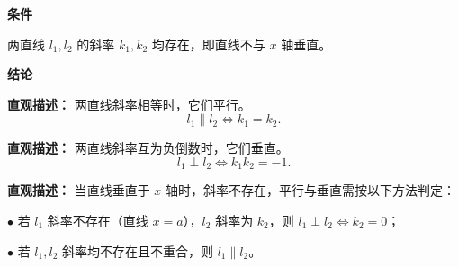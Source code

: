 \begin{statementbox}

	\textbf{\textcolor{CStatement}{条件}}
	\begin{description}[style=nextline, leftmargin=2.8em, labelsep=0.5em, itemsep=0.35em]
		\item[\textbf{\textcolor{CStatement}{条件 1（斜率存在前提）：}}] 两直线 $l_1,l_2$ 的斜率 $k_1,k_2$ 均存在，即直线不与 $x$ 轴垂直。
	\end{description}

	\textbf{\textcolor{CStatement}{结论}}
	\begin{description}[style=nextline, leftmargin=2.8em, labelsep=0.5em, itemsep=0.45em]
		\item[\textbf{\textcolor{CStatement}{结论一（平行判定）：}}]
			\textbf{\textcolor{CStatement}{直观描述：}}
			两直线斜率相等时，它们平行。
			\[
				l_1 \parallel l_2 \Longleftrightarrow k_1 = k_2.
			\]

		\item[\textbf{\textcolor{CStatement}{结论二（垂直判定）：}}]
			\textbf{\textcolor{CStatement}{直观描述：}}
			两直线斜率互为负倒数时，它们垂直。
			\[
				l_1 \perp l_2 \Longleftrightarrow k_1 k_2 = -1.
			\]

		\item[\textbf{\textcolor{CStatement}{推广结论（斜率不存在情形）：}}]
			\textbf{\textcolor{CStatement}{直观描述：}}
			当直线垂直于 $x$ 轴时，斜率不存在，平行与垂直需按以下方法判定：
			\par
			$\bullet$ 若 $l_1$ 斜率不存在（直线 $x=a$），$l_2$ 斜率为 $k_2$，则 $l_1 \perp l_2 \Longleftrightarrow k_2 = 0$；
			\par
			$\bullet$ 若 $l_1,l_2$ 斜率均不存在且不重合，则 $l_1 \parallel l_2$。
	\end{description}

\end{statementbox}
